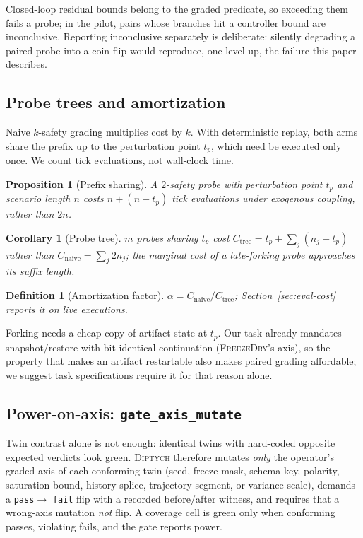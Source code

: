 \documentclass[conference]{IEEEtran}
\newtheorem{proposition}{Proposition}
\newtheorem{definition}{Definition}
\newtheorem{corollary}{Corollary}
\newcommand{\sys}{\textsc{Diptych}}
\begin{document}
	Closed-loop residual bounds belong to the graded predicate, so exceeding
	them fails a probe; in the pilot, pairs whose branches hit a controller
	bound are inconclusive. Reporting inconclusive separately is deliberate:
	silently degrading a paired probe into a coin flip would reproduce, one
	level up, the failure this paper describes.
	
	\subsection{Probe trees and amortization}
	
	Naive $k$-safety grading multiplies cost by $k$. With deterministic replay,
	both arms share the prefix up to the perturbation point $t_p$, which need
	be executed only once. We count tick evaluations, not wall-clock time.
	
	\begin{proposition}[Prefix sharing]
		\label{prop:prefix}
		A $2$-safety probe with perturbation point $t_p$ and scenario length $n$
		costs $n + (n - t_p)$ tick evaluations under exogenous coupling, rather
		than $2n$.
	\end{proposition}
	
	\begin{corollary}[Probe tree]
		\label{cor:tree}
		$m$ probes sharing $t_p$ cost $C_{\mathrm{tree}} = t_p + \sum_{j}(n_j -
		t_p)$ rather than $C_{\mathrm{naive}} = \sum_j 2 n_j$; the marginal cost
		of a late-forking probe approaches its suffix length.
	\end{corollary}
	
	\begin{definition}[Amortization factor]
		\label{def:cost}
		$\alpha = C_{\mathrm{naive}} / C_{\mathrm{tree}}$;
		Section~\ref{sec:eval-cost} reports it on live executions.
	\end{definition}
	
	Forking needs a cheap copy of artifact state at $t_p$. Our task already
	mandates snapshot/restore with bit-identical continuation
	(\textsc{FreezeDry}'s axis), so the property that makes an artifact
	restartable also makes paired grading affordable; we suggest task
	specifications require it for that reason alone.
	
	\subsection{Power-on-axis: \texttt{gate\_axis\_mutate}}
	
	Twin contrast alone is not enough: identical twins with hard-coded
	opposite expected verdicts look green. \sys{} therefore mutates
	\emph{only} the operator's graded axis of each conforming twin (seed,
	freeze mask, schema key, polarity, saturation bound, history splice,
	trajectory segment, or variance scale), demands a \texttt{pass}$\to$%
	\texttt{fail} flip with a recorded before/after witness, and requires
	that a wrong-axis mutation \emph{not} flip. A coverage cell is green only
	when conforming passes, violating fails, and the gate reports power.
	
\end{document}
